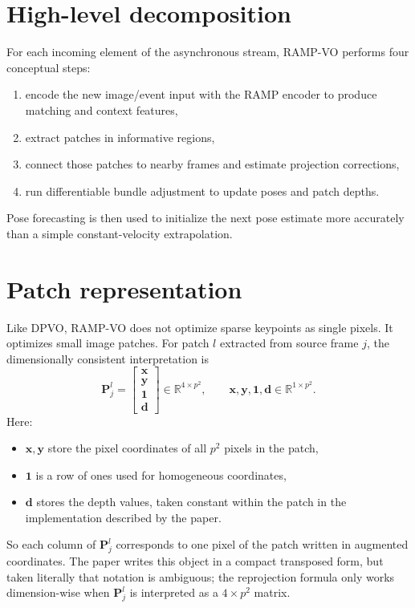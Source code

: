 \documentclass[11pt]{article}
\newcommand{\R}{\mathbb{R}}
\begin{document}
\section{High-level decomposition}

For each incoming element of the asynchronous stream, RAMP-VO performs four conceptual steps:
\begin{enumerate}
    \item encode the new image/event input with the RAMP encoder to produce matching and context features,
    \item extract patches in informative regions,
    \item connect those patches to nearby frames and estimate projection corrections,
    \item run differentiable bundle adjustment to update poses and patch depths.
\end{enumerate}
Pose forecasting is then used to initialize the next pose estimate more accurately than a simple constant-velocity extrapolation.

\section{Patch representation}

Like DPVO, RAMP-VO does not optimize sparse keypoints as single pixels.
It optimizes small image patches.
For patch \(l\) extracted from source frame \(j\), the dimensionally consistent interpretation is
\begin{equation}
\mathbf{P}_j^l =
\begin{bmatrix}
\mathbf{x} \\
\mathbf{y} \\
\mathbf{1} \\
\mathbf{d}
\end{bmatrix}
\in \R^{4\times p^2},
\qquad
\mathbf{x},\mathbf{y},\mathbf{1},\mathbf{d}\in\R^{1\times p^2}.
\end{equation}
Here:
\begin{itemize}
    \item \(\mathbf{x},\mathbf{y}\) store the pixel coordinates of all \(p^2\) pixels in the patch,
    \item \(\mathbf{1}\) is a row of ones used for homogeneous coordinates,
    \item \(\mathbf{d}\) stores the depth values, taken constant within the patch in the implementation described by the paper.
\end{itemize}
So each column of \(\mathbf{P}_j^l\) corresponds to one pixel of the patch written in augmented coordinates. The paper writes this object in a compact transposed form, but taken literally that notation is ambiguous; the reprojection formula only works dimension-wise when \(\mathbf{P}_j^l\) is interpreted as a \(4\times p^2\) matrix.
\end{document}
